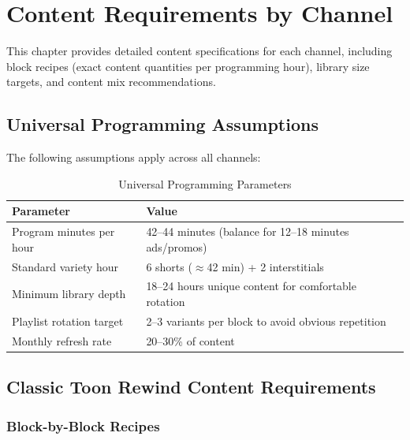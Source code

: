 \documentclass[12pt,letterpaper,twoside]{report}
\begin{document}
\chapter{Content Requirements by Channel}
\label{ch:content-requirements}

This chapter provides detailed content specifications for each channel, including block recipes (exact content quantities per programming hour), library size targets, and content mix recommendations.

\section{Universal Programming Assumptions}

The following assumptions apply across all channels:

\begin{table}[H]
\centering
\caption{Universal Programming Parameters}
\label{tab:universal-params}
\begin{tabular}{@{}L{5cm}L{9cm}@{}}
\toprule
\textbf{Parameter} & \textbf{Value} \\
\midrule
Program minutes per hour & 42--44 minutes (balance for 12--18 minutes ads/promos) \\
Standard variety hour & 6 shorts ($\approx$42 min) + 2 interstitials \\
Minimum library depth & 18--24 hours unique content for comfortable rotation \\
Playlist rotation target & 2--3 variants per block to avoid obvious repetition \\
Monthly refresh rate & 20--30\% of content \\
\bottomrule
\end{tabular}
\end{table}

\section{Classic Toon Rewind Content Requirements}

\subsection{Block-by-Block Recipes}
\end{document}
